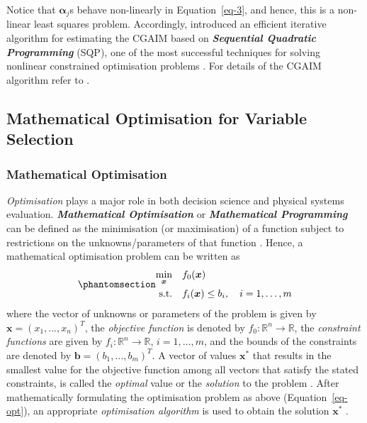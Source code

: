 \documentclass[
  11pt,
  a4paper,
]{article}
\begin{document}
Notice that \(\bm{\alpha}_{j}\)s behave non-linearly in
Equation~\ref{eq-3}, and hence, this is a non-linear least squares
problem. Accordingly, \textcite{Masselot2022} introduced an efficient
iterative algorithm for estimating the CGAIM based on
\textbf{\emph{Sequential Quadratic Programming}} (SQP), one of the most
successful techniques for solving nonlinear constrained optimisation
problems \autocite{Boggs1995}. For details of the CGAIM algorithm refer
to \textcite{Masselot2022}.

\subsection{Mathematical Optimisation for Variable
Selection}\label{mathematical-optimisation-for-variable-selection}

\subsubsection{Mathematical
Optimisation}\label{mathematical-optimisation}

\emph{Optimisation} plays a major role in both decision science and
physical systems evaluation. \textbf{\emph{Mathematical Optimisation}}
or \textbf{\emph{Mathematical Programming}} can be defined as the
minimisation (or maximisation) of a function subject to restrictions on
the unknowns/parameters of that function \autocite{Nocedal2006}. Hence,
a mathematical optimisation problem can be written as
\begin{equation}\phantomsection\label{eq-opt}{
\begin{aligned}
  \min_{\bm{x}} \quad & f_{0}(\bm{x})\\
  \text{s.t.} \quad & f_{i}(\bm{x}) \le b_{i}, \quad i = 1, \dots, m
\end{aligned}
}\end{equation} where the vector of unknowns or parameters of the
problem is given by
\(\bm{x} = \left ( x_{1}, \dots, x_{n} \right )^{T}\), the
\emph{objective function} is denoted by
\(f_{0} : \mathbb{R}^{n} \rightarrow \mathbb{R}\), the \emph{constraint
functions} are given by
\(f_{i} : \mathbb{R}^{n} \rightarrow \mathbb{R}\), \(i = 1, \dots, m\),
and the bounds of the constraints are denoted by
\(\bm{b} = \left (b_{1}, \dots, b_{m} \right )^{T}\). A vector of values
\(\bm{x^{*}}\) that results in the smallest value for the objective
function among all vectors that satisfy the stated constraints, is
called the \emph{optimal} value or the \emph{solution} to the problem
\autocite{Boyd2004}. After mathematically formulating the optimisation
problem as above (Equation~\ref{eq-opt}), an appropriate
\emph{optimisation algorithm} is used to obtain the solution
\(\bm{x^{*}}\) \autocite{Nocedal2006}.
\end{document}
